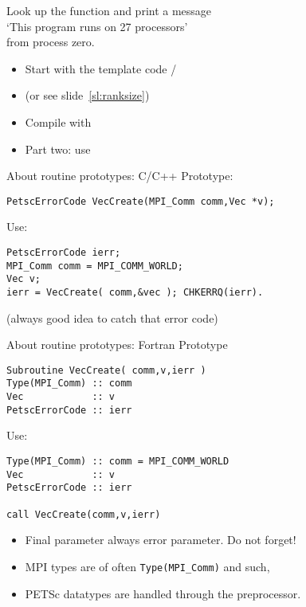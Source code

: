 \begin{exerciseframe}[hello]
Look up the function  and print a message\\
`This program runs on 27 processors'\\
from process zero.

\begin{itemize}
\item Start with the template code /
\item (or see slide~\ref{sl:ranksize})
\item Compile with 
\item Part two: use 
\end{itemize}
\end{exerciseframe}


\begin{frame}[containsverbatim]{About routine prototypes: C/C++}
  \label{sec:protos}
Prototype:
\begin{verbatim}
PetscErrorCode VecCreate(MPI_Comm comm,Vec *v);
\end{verbatim}
Use:
\begin{verbatim}
PetscErrorCode ierr;
MPI_Comm comm = MPI_COMM_WORLD;
Vec v;
ierr = VecCreate( comm,&vec ); CHKERRQ(ierr).
\end{verbatim}
(always good idea to catch that error code)
\end{frame}

\lstset{language=Fortran}
\begin{frame}[containsverbatim]{About routine prototypes: Fortran}
Prototype
\begin{verbatim}
Subroutine VecCreate( comm,v,ierr )
Type(MPI_Comm) :: comm
Vec            :: v
PetscErrorCode :: ierr
\end{verbatim}
Use:
\begin{verbatim}
Type(MPI_Comm) :: comm = MPI_COMM_WORLD
Vec            :: v
PetscErrorCode :: ierr

call VecCreate(comm,v,ierr)
\end{verbatim}
\begin{itemize}
\item Final parameter always error parameter. Do not forget!
\item MPI types are of often \lstinline{Type(MPI_Comm)} and such,
\item PETSc datatypes are handled through the preprocessor.
\end{itemize}
\end{frame}

